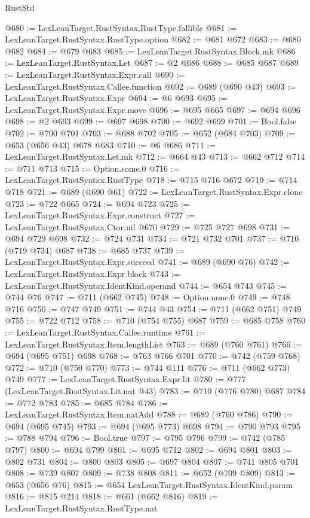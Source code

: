 \begin{lexlean}{RustStd}
\begin{coremodule}
@680 := LexLeanTarget.RustSyntax.RustType.fallible
@681 := LexLeanTarget.RustSyntax.RustType.option
@682 := @681 @672
@683 := @680 @682
@684 := @679 @683
@685 := LexLeanTarget.RustSyntax.Block.mk
@686 := LexLeanTarget.RustSyntax.Let
@687 := @2 @686
@688 := @685 @687
@689 := LexLeanTarget.RustSyntax.Expr.call
@690 := LexLeanTarget.RustSyntax.Callee.function
@692 := @689 (@690 @43)
@693 := LexLeanTarget.RustSyntax.Expr
@694 := @6 @693
@695 := LexLeanTarget.RustSyntax.Expr.move
@696 := @695 @665
@697 := @694 @696
@698 := @2 @693
@699 := @697 @698
@700 := @692 @699
@701 := Bool.false
@702 := @700 @701
@703 := @688 @702
@705 := @652 (@684 @703)
@709 := @653 (@656 @43) @678 @683
@710 := @6 @686
@711 := LexLeanTarget.RustSyntax.Let.mk
@712 := @664 @43
@713 := @662 @712
@714 := @711 @713
@715 := Option.some.{0}
@716 := LexLeanTarget.RustSyntax.RustType
@718 := @715 @716 @672
@719 := @714 @718
@721 := @689 (@690 @61)
@722 := LexLeanTarget.RustSyntax.Expr.clone
@723 := @722 @665
@724 := @694 @723
@725 := LexLeanTarget.RustSyntax.Expr.construct
@727 := LexLeanTarget.RustSyntax.Ctor.nil @670
@729 := @725 @727 @698
@731 := @694 @729 @698
@732 := @724 @731
@734 := @721 @732 @701
@737 := @710 (@719 @734) @687
@738 := @685 @737
@739 := LexLeanTarget.RustSyntax.Expr.succeed
@741 := @689 (@690 @76)
@742 := LexLeanTarget.RustSyntax.Expr.block
@743 := LexLeanTarget.RustSyntax.IdentKind.operand
@744 := @654 @743
@745 := @744 @76
@747 := @711 (@662 @745)
@748 := Option.none.{0}
@749 := @748 @716
@750 := @747 @749
@751 := @744 @43
@754 := @711 (@662 @751) @749
@755 := @722 @712
@758 := @710 (@754 @755) @687
@759 := @685 @758
@760 := LexLeanTarget.RustSyntax.Callee.runtime
@761 := LexLeanTarget.RustSyntax.Item.lengthList
@763 := @689 (@760 @761)
@766 := @694 (@695 @751) @698
@768 := @763 @766 @701
@770 := @742 (@759 @768)
@772 := @710 (@750 @770)
@773 := @744 @111
@776 := @711 (@662 @773) @749
@777 := LexLeanTarget.RustSyntax.Expr.lit
@780 := @777 (LexLeanTarget.RustSyntax.Lit.nat @43)
@783 := @710 (@776 @780) @687
@784 := @772 @783
@785 := @685 @784
@786 := LexLeanTarget.RustSyntax.Item.natAdd
@788 := @689 (@760 @786)
@790 := @694 (@695 @745)
@793 := @694 (@695 @773) @698
@794 := @790 @793
@795 := @788 @794
@796 := Bool.true
@797 := @795 @796
@799 := @742 (@785 @797)
@800 := @694 @799
@801 := @695 @712
@802 := @694 @801
@803 := @802 @731
@804 := @800 @803
@805 := @697 @804
@807 := @741 @805 @701
@808 := @739 @807
@809 := @738 @808
@811 := @652 (@709 @809)
@813 := @653 (@656 @76)
@815 := @654 LexLeanTarget.RustSyntax.IdentKind.param
@816 := @815 @214
@818 := @661 (@662 @816)
@819 := LexLeanTarget.RustSyntax.RustType.nat

\end{coremodule}
\end{lexlean}
